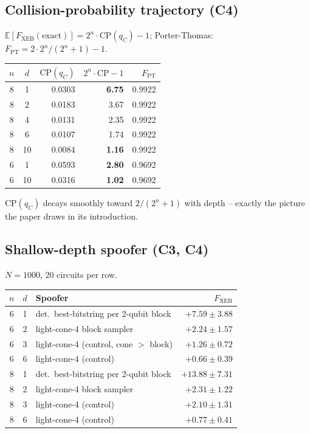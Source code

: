 \documentclass[11pt]{article}
\begin{document}
\subsection{Collision-probability trajectory (C4)}
$\mathbb{E}[F_{\mathrm{XEB}}(\text{exact})] = 2^n\cdot\mathrm{CP}(q_C) - 1$;
Porter-Thomas: $F_{\mathrm{PT}} = 2\cdot 2^n/(2^n+1) - 1$.

\begin{center}\small
\begin{tabular}{ccrrr}
\toprule
$n$ & $d$ & $\mathrm{CP}(q_C)$ & $2^n\cdot\mathrm{CP}-1$ & $F_{\mathrm{PT}}$ \\
\midrule
8 & 1  & 0.0303 & \textbf{6.75} & 0.9922 \\
8 & 2  & 0.0183 & 3.67          & 0.9922 \\
8 & 4  & 0.0131 & 2.35          & 0.9922 \\
8 & 6  & 0.0107 & 1.74          & 0.9922 \\
8 & 10 & 0.0084 & \textbf{1.16} & 0.9922 \\
6 & 1  & 0.0593 & \textbf{2.80} & 0.9692 \\
6 & 10 & 0.0316 & \textbf{1.02} & 0.9692 \\
\bottomrule
\end{tabular}
\end{center}

$\mathrm{CP}(q_C)$ decays smoothly toward $2/(2^n+1)$ with depth --
exactly the picture the paper draws in its introduction.

\subsection{Shallow-depth spoofer (C3, C4)}
$N=1000$, 20 circuits per row.

\begin{center}\small
\begin{tabular}{cclr}
\toprule
$n$ & $d$ & Spoofer & $F_{\mathrm{XEB}}$ \\
\midrule
6 & 1 & det.\ best-bitstring per 2-qubit block          & $\mathbf{+7.59\pm 3.88}$  \\
6 & 2 & light-cone-4 block sampler                       & $\mathbf{+2.24\pm 1.57}$  \\
6 & 3 & light-cone-4 (control, cone $>$ block)           & $+1.26\pm 0.72$           \\
6 & 6 & light-cone-4 (control)                           & $+0.66\pm 0.39$           \\
8 & 1 & det.\ best-bitstring per 2-qubit block          & $\mathbf{+13.88\pm 7.31}$ \\
8 & 2 & light-cone-4 block sampler                       & $\mathbf{+2.31\pm 1.22}$  \\
8 & 3 & light-cone-4 (control)                           & $+2.10\pm 1.31$           \\
8 & 6 & light-cone-4 (control)                           & $+0.77\pm 0.41$           \\
\bottomrule
\end{tabular}
\end{center}
\end{document}
